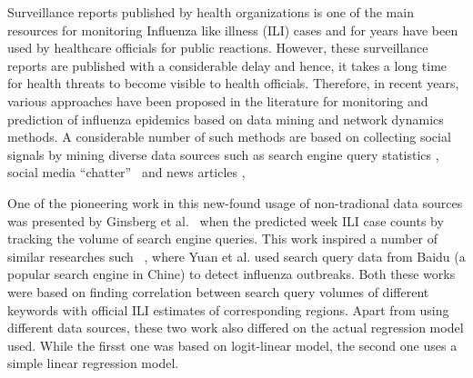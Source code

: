 Surveillance reports published by health organizations is one of the
main resources for monitoring Influenza like illness (ILI) cases and for
years have been used by healthcare officials for public reactions.
However, these surveillance reports are published with a considerable
delay and hence, it takes a long time for health threats to become
visible to health officials. Therefore, in recent years, various
approaches have been proposed in the literature for monitoring and
prediction of influenza epidemics based on data mining and network
dynamics methods. A considerable number of such methods are based on collecting
social signals by mining diverse data sources such as 
search engine query statistics \cite{ref1, ref2}, social
media ``chatter''~\cite{ref3, ref4, ref5, ref6, ref7} and news articles \cite{ref8},



One of the pioneering work in this new-found usage of non-tradional data sources 
was presented by Ginsberg et al.~\cite{ref2} when the predicted week ILI case counts
by tracking the volume of search engine queries. This work inspired a number of similar 
researches such ~\cite{ref1}, where Yuan et al. used search query data from Baidu (a popular
search engine in Chine) to detect influenza outbreaks. Both these works were based on finding 
correlation between search query volumes of different keywords with official ILI estimates 
of corresponding regions. Apart from using different data sources, 
these two work also differed on the actual regression model used. While the firsst one was based on 
logit-linear model, the second one uses a simple linear regression model. 

